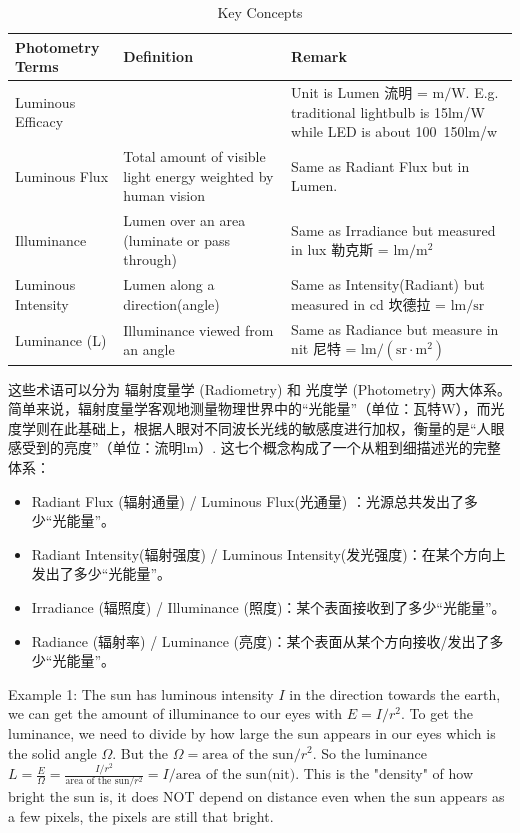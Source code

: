 \documentclass[UTF8]{ctexart}
\begin{document}
\begin{table}[h]
	\centering
	\caption{Key Concepts}
	\begin{tabularx}{\textwidth}{| l | X | X |} %
		\hline
		\textbf{Photometry Terms} & Definition & \textbf{Remark} \\
		\hline
		Luminous Efficacy & & Unit is Lumen 流明 = $\text{m} / \text{W}$. E.g. traditional lightbulb is 15lm/W while LED is about 100~150lm/w \\
		\hline
		Luminous Flux & Total amount of visible light energy weighted by human vision &  Same as Radiant Flux but in Lumen. \\
		\hline
		Illuminance  & Lumen over an area (luminate or pass through) & Same as Irradiance but measured in lux 勒克斯 =  $\text{lm} / \text{m}^2$  \\
		\hline
		Luminous Intensity & Lumen along a direction(angle) &  Same as Intensity(Radiant) but measured in cd 坎德拉 = $\text{lm}/\text{sr}$ \\
		\hline
		Luminance (L) & Illuminance viewed from an angle  &  Same as Radiance but measure in nit 尼特 =  $\text{lm} / (\text{sr}\cdot\text{m}^2)$ \\
	\end{tabularx}
\end{table}

\FloatBarrier %

这些术语可以分为 辐射度量学 (Radiometry) 和 光度学 (Photometry) 两大体系。简单来说，辐射度量学客观地测量物理世界中的“光能量”（单位：瓦特W），而光度学则在此基础上，根据人眼对不同波长光线的敏感度进行加权，衡量的是“人眼感受到的亮度”（单位：流明lm）. 这七个概念构成了一个从粗到细描述光的完整体系：
\begin{itemize}
\item Radiant Flux (辐射通量) / Luminous Flux(光通量) ：光源总共发出了多少“光能量”。
\item Radiant Intensity(辐射强度) / Luminous Intensity(发光强度)：在某个方向上发出了多少“光能量”。
\item Irradiance (辐照度) / Illuminance (照度)：某个表面接收到了多少“光能量”。
\item Radiance (辐射率) / Luminance (亮度)：某个表面从某个方向接收/发出了多少“光能量”。
\end{itemize}

Example 1: The sun has luminous intensity $I$ in the direction towards the earth, we can get the amount of illuminance to our eyes with $E = I/r^2$.  To get the luminance, we need to divide by how large the sun appears in our eyes which is the solid angle $\Omega$. But the $\Omega = \text{area of the sun} / r^2$. So the luminance $L = \frac{E}{\Omega} = \frac{I/r^2}{\text{area of the sun}/r^2} = I /\text{area of the sun} \text{(nit)}$. This is the "density" of how bright the sun is, it does NOT depend on distance even when the sun appears as a few pixels, the pixels are still that bright.
\end{document}
